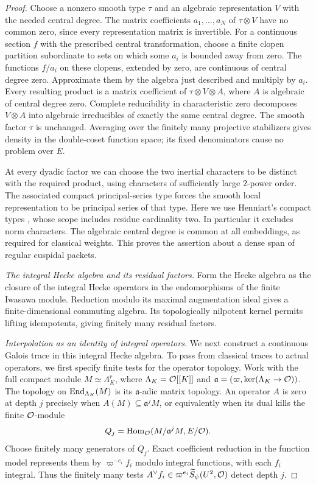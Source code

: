 \begin{proof}
Choose a nonzero smooth type \(\tau\) and an algebraic
representation \(V\) with the needed central degree.
The matrix coefficients \(a_1,\ldots,a_N\) of
\(\tau\otimes V\) have no common zero, since every
representation matrix is invertible. For a continuous
section \(f\) with the prescribed central transformation,
choose a finite clopen partition subordinate to sets on
which some \(a_i\) is bounded away from zero. The functions
\(f/a_i\) on these clopens, extended by zero, are continuous
of central degree zero. Approximate them by the algebra
just described and multiply by \(a_i\).
Every resulting product is a matrix coefficient of
\(\tau\otimes V\otimes A\), where \(A\) is algebraic of
central degree zero. Complete reducibility in characteristic
zero decomposes \(V\otimes A\) into algebraic irreducibles
of exactly the same central degree. The smooth factor
\(\tau\) is unchanged. Averaging over the finitely many
projective stabilizers gives density in the double-coset
function space; its fixed denominators cause no problem
over \(E\).

At every dyadic factor we can choose the two inertial
characters to be distinct with the required product,
using characters of sufficiently large \(2\)-power order.
The associated compact principal-series type forces the
smooth local representation to be principal series of
that type. Here we use Henniart's compact types
\cite[Appendix~A, Sections~A.1.1--A.1.4 and A.2.3--A.2.4]{BreuilMezard2002},
whose scope includes residue cardinality two. In particular it excludes norm characters.
The algebraic central degree is common at all embeddings,
as required for classical weights. This proves the
assertion about a dense span of regular cuspidal packets.

\emph{The integral Hecke algebra and its residual factors.}
Form the Hecke algebra as the closure
of the integral Hecke operators in the endomorphisms of
the finite Iwasawa module. Reduction modulo its maximal
augmentation ideal gives a finite-dimensional commuting
algebra. Its topologically nilpotent kernel permits
lifting idempotents, giving finitely many residual factors.

\emph{Interpolation as an identity of integral operators.}
We next construct a continuous Galois trace in this integral Hecke
algebra. To pass from classical traces to actual operators, we first
specify finite tests for the operator topology. Work with
the full compact module
\(M\simeq\Lambda_K^r\), where
\(\Lambda_K=\mathcal O[[K]]\) and
\(\mathfrak a=(\varpi,\ker(\Lambda_K\to\mathcal O))\).
The topology on \(\operatorname{End}_{\Lambda_K}(M)\) is its
\(\mathfrak a\)-adic matrix topology. An operator \(A\)
is zero at depth \(j\) precisely when
\(A(M)\subseteq\mathfrak a^jM\), or equivalently
when its dual kills the finite \(\mathcal O\)-module
\[
 Q_j=\operatorname{Hom}_\mathcal O(M/\mathfrak a^jM,E/\mathcal O).
\]
Choose finitely many generators of \(Q_j\). Exact
coefficient reduction in the function model represents
them by \(\varpi^{-e_i}f_i\) modulo integral functions,
with each \(f_i\) integral. Thus the finitely many tests
\(A^\vee f_i\in\varpi^{e_i}\widetilde S_\psi(U^2,\mathcal O)\)
detect depth \(j\).


\end{proof}
